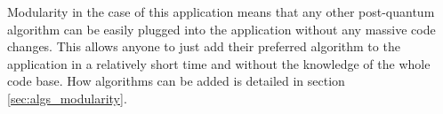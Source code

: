 Modularity in the case of this application means that any other post-quantum algorithm can be easily plugged into the application without any massive code changes. This allows anyone to just add their preferred algorithm to the application in a relatively short time and without the knowledge of the whole code base. How algorithms can be added is detailed in section \ref{sec:algs_modularity}.
